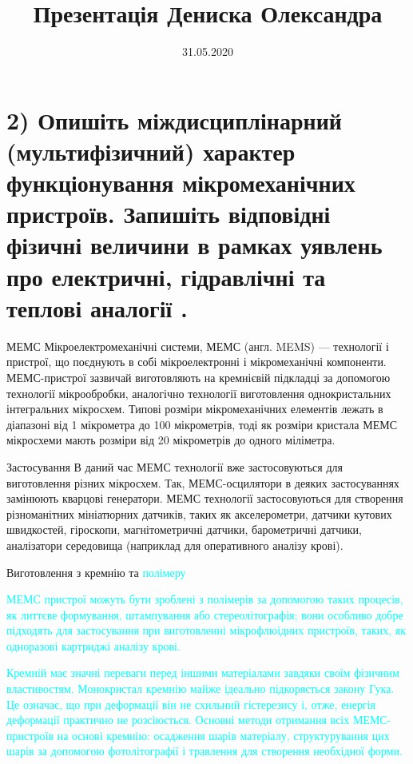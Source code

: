 \documentclass{beamer}
\title{Презентація Дениска Олександра}
\date{31.05.2020}
\institute{\center"Київський політехнічний інститут імені Ігоря Сікорського" \\ група ДП-82\\студент II  курсу\\ Факультету Електроніки
}
\begin{document}
  \maketitle
  \section
  {2) \small{Опишіть міждисциплінарний (мультифізичний) характер функціонування мікромеханічних пристроїв. Запишіть відповідні фізичні величини в рамках уявлень про електричні, гідравлічні та теплові аналогії .
}}
  
  
  
  \begin{frame}{МЕМС}
  Мікроелектромеханічні системи, МЕМС (англ. MEMS) — технології і пристрої, що поєднують в собі мікроелектронні і мікромеханічні компоненти. МЕМС-пристрої зазвичай виготовляють на кремнієвій підкладці за допомогою технології мікрообробки, аналогічно технології виготовлення однокристальних інтегральних мікросхем. Типові розміри мікромеханічних елементів лежать в діапазоні від 1 мікрометра до 100 мікрометрів, тоді як розміри кристала МЕМС мікросхеми мають розміри від 20 мікрометрів до одного міліметра.  
  \end{frame}
  
  
\begin{frame}{Застосування}
В даний час МЕМС технології вже застосовуються для виготовлення різних мікросхем. Так, МЕМС-осцилятори в деяких застосуваннях замінюють кварцові генератори. МЕМС технології застосовуються для створення різноманітних мініатюрних датчиків, таких як акселерометри, датчики кутових швидкостей, гіроскопи, магнітометричні датчики, барометричні датчики, аналізатори середовища (наприклад для оперативного аналізу крові).
  \end{frame}



\begin{frame}{Виготовлення з \textcolor{Mycolor1}{кремнію} та \textcolor{cyan}{полімеру}}
\begin{itemize}
  \item \textcolor{cyan}{МЕМС пристрої можуть бути зроблені з полімерів за допомогою таких процесів, як литтєве формування, штампування або стереолітографія; вони особливо добре підходять для застосування при виготовленні мікрофлюідних пристроїв, таких, як одноразові картриджі аналізу крові.
  \item \textcolor{Mycolor1}{ Кремній має значні переваги перед іншими матеріалами завдяки своїм фізичним властивостям. Монокристал кремнію майже ідеально підкоряється закону Гука. Це означає, що при деформації він не схильний гістерезису і, отже, енергія деформації практично не розсіюється. Основні методи отримання всіх МЕМС-пристроїв на основі кремнію: осадження шарів матеріалу, структурування цих шарів за допомогою фотолітографії і травлення для створення необхідної форми.}
 }
 \end{itemize}

  \end{frame}
\end{document}
